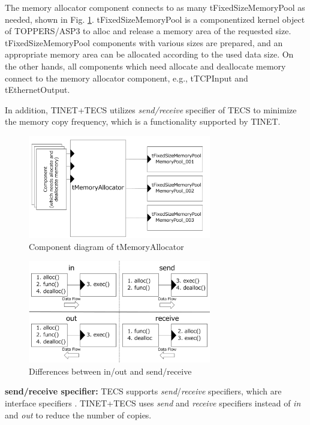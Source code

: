 \documentclass[conference]{IEEEtran/IEEEtran}
\begin{document}
The memory allocator component connects to as many tFixedSizeMemoryPool as needed, shown in Fig. \ref{fig:tMemoryAllocator}.
tFixedSizeMemoryPool is a componentized kernel object of TOPPERS/ASP3 to alloc and release a memory area of the requested size. 
tFixedSizeMemoryPool components with various sizes are prepared, and an appropriate memory area can be allocated according to the used data size.
On the other hands, all components which need allocate and deallocate memory connect to the memory allocator component, e.g., tTCPInput and tEthernetOutput.

In addition, TINET+TECS utilizes {\it send/receive} specifier of TECS to minimize the memory copy frequency, which is a functionality supported by TINET.

\begin{figure}[t]
    \centering
    \includegraphics[width=8.0cm,clip]{figure/tMemoryAllocator.pdf}
    \caption{Component diagram of tMemoryAllocator}
    \label{fig:tMemoryAllocator}
\end{figure}

\begin{figure}[t]
    \centering
    \includegraphics[width=8.0cm,clip]{figure/SendReceive.pdf}
    \caption{Differences between in/out and send/receive}
    \label{fig:SendReceive}
\end{figure}

{\bf send/receive specifier:}
TECS supports {\it send}/{\it receive} specifiers, which are interface specifiers \cite{par:RPC}.
TINET+TECS uses {\it send} and {\it receive} specifiers instead of {\it in} and {\it out} to reduce the number of copies.
\end{document}

